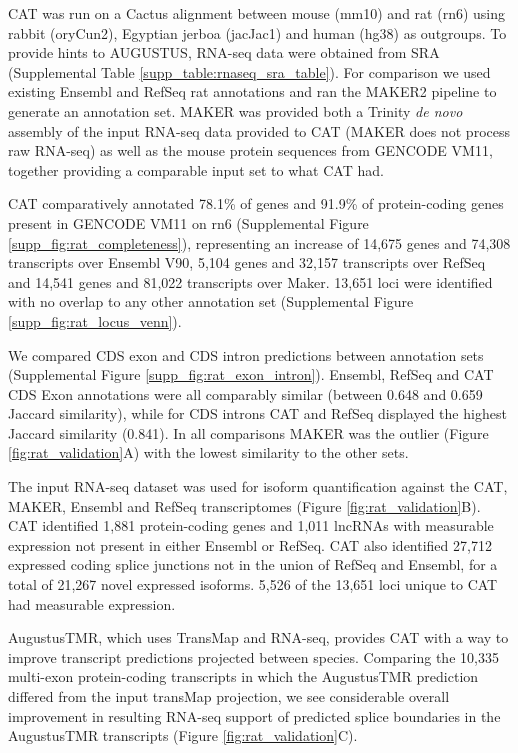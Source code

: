 \documentclass[fleqn,10pt]{wlscirep}
\begin{document}
CAT was run on a Cactus alignment between mouse (mm10) and rat (rn6) using rabbit (oryCun2), Egyptian jerboa (jacJac1) and human (hg38) as outgroups. To provide hints to AUGUSTUS, RNA-seq data were obtained from SRA \cite{fushan2015gene,cortez2014origins,liu2016identification} (Supplemental Table \ref{supp_table:rnaseq_sra_table}). For comparison we used existing Ensembl and RefSeq rat annotations and ran the MAKER2 pipeline \cite{cantarel2008maker} to generate an annotation set. MAKER was provided both a Trinity \cite{haas2013novo} \textit{de novo} assembly of the input RNA-seq data provided to CAT (MAKER does not process raw RNA-seq) as well as the mouse protein sequences from GENCODE VM11, together providing a comparable input set to what CAT had. 
    
CAT comparatively annotated 78.1\% of genes and 91.9\% of protein-coding genes present in GENCODE VM11 on rn6 (Supplemental Figure \ref{supp_fig:rat_completeness}), representing an increase of 14,675 genes and 74,308 transcripts over Ensembl V90, 5,104 genes and 32,157 transcripts over RefSeq and 14,541 genes and 81,022 transcripts over Maker. 13,651 loci were identified with no overlap to any other annotation set (Supplemental Figure \ref{supp_fig:rat_locus_venn}).

We compared CDS exon and CDS intron predictions between annotation sets (Supplemental Figure \ref{supp_fig:rat_exon_intron}). Ensembl, RefSeq and CAT CDS Exon annotations were all comparably similar (between 0.648 and 0.659 Jaccard similarity), while for CDS introns CAT and RefSeq displayed the highest Jaccard similarity (0.841). In all comparisons MAKER was the outlier (Figure \ref{fig:rat_validation}A) with the lowest similarity to the other sets.
    
The input RNA-seq dataset was used for isoform quantification against the CAT, MAKER, Ensembl and RefSeq transcriptomes (Figure \ref{fig:rat_validation}B). CAT identified 1,881 protein-coding genes and 1,011 lncRNAs with measurable expression not present in either Ensembl or RefSeq. CAT also identified 27,712 expressed coding splice junctions not in the union of RefSeq and Ensembl, for a total of 21,267 novel expressed isoforms. 5,526 of the 13,651 loci unique to CAT had measurable expression. 

AugustusTMR, which uses TransMap and RNA-seq, provides CAT with a way to improve transcript predictions projected between species. Comparing the  10,335 multi-exon protein-coding transcripts in which the AugustusTMR prediction differed from the input transMap projection, we see considerable overall improvement in resulting RNA-seq support of predicted splice boundaries in the AugustusTMR transcripts (Figure \ref{fig:rat_validation}C). 
\end{document}
